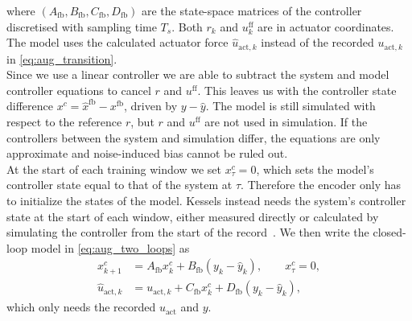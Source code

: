 where $(A_{\mathrm{fb}},B_{\mathrm{fb}},C_{\mathrm{fb}},D_{\mathrm{fb}})$
are the state-space matrices of the controller discretised
with sampling time $T_s$.
Both $r_k$ and $u^{\mathrm{ff}}_k$ are in actuator coordinates.
The model uses the calculated actuator force $\hat u_{\mathrm{act},k}$
instead of the recorded $u_{\mathrm{act},k}$
in \eqref{eq:aug_transition}.
\\
Since we use a linear controller we are able to subtract the system 
and model controller equations to cancel $r$ and $u^{\mathrm{ff}}$.
This leaves us with the controller state difference
$x^c=\hat x^{\mathrm{fb}}-x^{\mathrm{fb}}$,
driven by $y-\hat y$.
The model is still simulated with respect to the reference $r$,
but $r$ and $u^{\mathrm{ff}}$ are not used in simulation.
If the controllers between the system and simulation differ, 
the equations are only approximate and noise-induced bias
cannot be ruled out.
\\
At the start of each training window we set $x^c_\tau=0$, 
which sets the model's controller state equal to that of the system at $\tau$.
Therefore the encoder only has to initialize the states of the model.
Kessels instead needs the system's controller state at the start of each
window, either measured directly or calculated by simulating the
controller from the start of the record~\cite[Remark~5.4]{kessels2025ai}.
We then write the closed-loop model in \eqref{eq:aug_two_loops} as
\begin{equation}
\begin{aligned}
 x^{c}_{k+1}&=A_{\mathrm{fb}}x^{c}_k+B_{\mathrm{fb}}(y_k-\hat y_k),\qquad x^{c}_\tau=0,\\
 \hat u_{\mathrm{act},k}&=u_{\mathrm{act},k}+C_{\mathrm{fb}}x^{c}_k+D_{\mathrm{fb}}(y_k-\hat y_k),
\end{aligned}
\label{eq:aug_residual_loop}
\end{equation}
which only needs the recorded $u_{\mathrm{act}}$ and $y$.
\\
